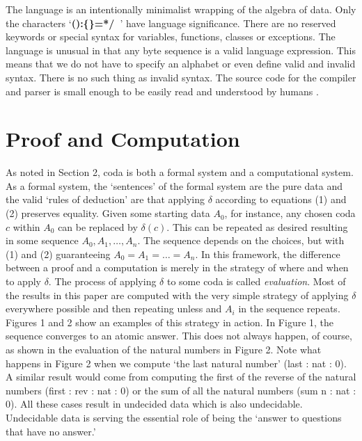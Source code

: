 \documentclass[11pt]{article}
\begin{document}
     The language is an intentionally minimalist wrapping of the algebra of data.
Only the characters `{\bf():\{\}=*/\ }' have language significance.  There are no reserved keywords or
special syntax for variables, functions, classes or exceptions.  The language is unusual in that any byte sequence is a valid language expression.
This means that we do not have to specify an alphabet or even define valid and invalid syntax.  There is no such thing
as invalid syntax.  The source code for the compiler and parser is small enough to be easily read and understood by
humans \cite{github}.

\section{Proof and Computation}

     As noted in Section 2, coda is both a formal system and a computational system.  As a formal system, the `sentences' of the formal system
are the pure data and the valid `rules of deduction' are that applying $\delta$ according to equations (1) and (2) preserves equality.
Given some starting data $A_0$, for instance, any chosen coda $c$ within $A_0$ can be replaced by $\delta(c)$.  This can be repeated
as desired resulting in some sequence $A_0,A_1,\dots,A_n$.  The sequence depends on the choices, but with (1) and (2) guaranteeing
$A_0=A_1=\dots=A_n$.  In this framework, the difference between a proof and a computation is merely in the strategy of where and
when to apply $\delta$.  The process of applying $\delta$ to some coda is called {\it evaluation}.  Most of the results in this paper
are computed with the very simple strategy of applying $\delta$ everywhere possible and then repeating unless and $A_i$ in the sequence
repeats.  Figures 1 and 2 show an examples of this strategy in action.  In Figure 1, the sequence converges to an atomic answer.  This does
not always happen, of course, as shown in the evaluation of the natural numbers in Figure 2.  Note what happens in Figure 2 when we compute
`the last natural number'
(last : nat : 0).  A similar result would come from computing the first of the reverse of the natural numbers (first : rev : nat : 0) or the sum of all
the natural numbers (sum n : nat : 0).  All these cases result in undecided data which is also undecidable.  Undecidable data is serving the
essential role of being the `answer to questions that have no answer.'
\end{document}
